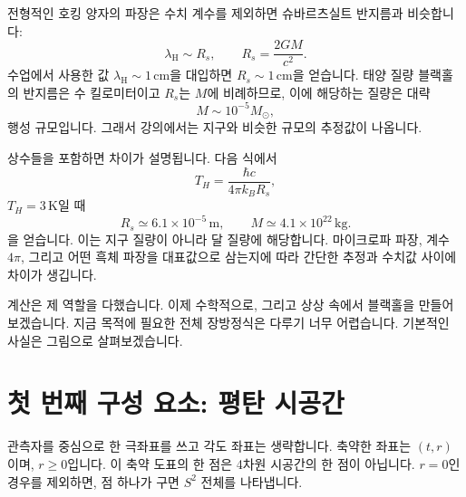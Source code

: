 전형적인 호킹 양자의 파장은 수치 계수를 제외하면 슈바르츠실트 반지름과 비슷합니다:
\begin{equation}
\lambda_{\mathrm{H}}\sim R_s,
\qquad
R_s=\frac{2GM}{c^2}.
\label{eq:l05-scale}
\end{equation}
수업에서 사용한 값 \(\lambda_{\mathrm H}\sim1\,\mathrm{cm}\)을 대입하면 \(R_s\sim1\,\mathrm{cm}\)을 얻습니다. 태양 질량 블랙홀의 반지름은 수 킬로미터이고 \(R_s\)는 \(M\)에 비례하므로, 이에 해당하는 질량은 대략
\begin{equation}
M\sim10^{-5}M_\odot,
\label{eq:l05-rough-mass}
\end{equation}
행성 규모입니다. 그래서 강의에서는 지구와 비슷한 규모의 추정값이 나옵니다.

\begin{classroomqa}
\end{classroomqa}

상수들을 포함하면 차이가 설명됩니다. 다음 식에서
\begin{equation}
T_H=\frac{\hbar c}{4\pi k_B R_s},
\end{equation}
\(T_H=3\,\mathrm{K}\)일 때
\begin{equation}
R_s\simeq6.1\times10^{-5}\,\mathrm{m},
\qquad
M\simeq4.1\times10^{22}\,\mathrm{kg}.
\label{eq:l05-three-kelvin}
\end{equation}을 얻습니다.
이는 지구 질량이 아니라 달 질량에 해당합니다. 마이크로파 파장, 계수 \(4\pi\), 그리고 어떤 흑체 파장을 대표값으로 삼는지에 따라 간단한 추정과 수치값 사이에 차이가 생깁니다.

계산은 제 역할을 다했습니다. 이제 수학적으로, 그리고 상상 속에서 블랙홀을 만들어 보겠습니다. 지금 목적에 필요한 전체 장방정식은 다루기 너무 어렵습니다. 기본적인 사실은 그림으로 살펴보겠습니다.

\section{첫 번째 구성 요소: 평탄 시공간}

관측자를 중심으로 한 극좌표를 쓰고 각도 좌표는 생략합니다. 축약한 좌표는 \((t,r)\)이며, \(r\geq0\)입니다. 이 축약 도표의 한 점은 4차원 시공간의 한 점이 아닙니다. \(r=0\)인 경우를 제외하면, 점 하나가 구면 \(S^2\) 전체를 나타냅니다.

